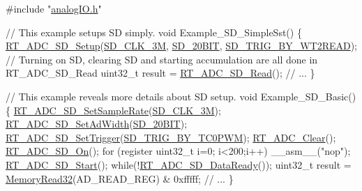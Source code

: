 \begin{DoxyCode}
\textcolor{preprocessor}{#include "\mbox{\hyperlink{a00002}{analogIO.h}}"}

\textcolor{comment}{// This example setups SD simply.}
\textcolor{keywordtype}{void} Example\_SD\_SimpleSst()
\{
    \mbox{\hyperlink{a00002_a312f152517ab50c1cda791e118dd4473}{RT\_ADC\_SD\_Setup}}(\mbox{\hyperlink{a00002_aebc3424fa91b715741f0320561ecfbb0a720c5991be73063f5ab035440f26b486}{SD\_CLK\_3M}}, \mbox{\hyperlink{a00002_a44030e617a742aba101c6dcd3ec2078ea3a9f3242e2567dcfb29f566e45cf6de0}{SD\_20BIT}}, 
      \mbox{\hyperlink{a00002_ab266bb772aaf5cffad6bede99cfb094ca9596adcc3a82f8e983e664a6ed5144a6}{SD\_TRIG\_BY\_WT2READ}});
    \textcolor{comment}{// Turning on SD, clearing SD and starting accumulation are all done in RT\_ADC\_SD\_Read}
    uint32\_t result = \mbox{\hyperlink{a00002_a5532ac461de55576a3875b29300c8536}{RT\_ADC\_SD\_Read}}();
    \textcolor{comment}{// ...}
\}

\textcolor{comment}{// This example reveals more details about SD setup.}
\textcolor{keywordtype}{void} Example\_SD\_Basic()
\{
    \mbox{\hyperlink{a00002_a246ce987fa2b9f254f4796340eb23ed0}{RT\_ADC\_SD\_SetSampleRate}}(\mbox{\hyperlink{a00002_aebc3424fa91b715741f0320561ecfbb0a720c5991be73063f5ab035440f26b486}{SD\_CLK\_3M}});
    \mbox{\hyperlink{a00002_acb989d89893ac99af984979cb9e8df2a}{RT\_ADC\_SD\_SetAdWidth}}(\mbox{\hyperlink{a00002_a44030e617a742aba101c6dcd3ec2078ea3a9f3242e2567dcfb29f566e45cf6de0}{SD\_20BIT}});
    \mbox{\hyperlink{a00002_a11bf38478bd196acd1f179115e714dfc}{RT\_ADC\_SD\_SetTrigger}}(\mbox{\hyperlink{a00002_ab266bb772aaf5cffad6bede99cfb094ca2da9ae6568d907b90ab68f56f8605ada}{SD\_TRIG\_BY\_TC0PWM}});
    \mbox{\hyperlink{a00002_a00318bd4fc3ce7ad4f03124b91891f4f}{RT\_ADC\_Clear}}();
    \mbox{\hyperlink{a00002_a3ed6d7d3daccf57a9ee5a9490d8985ad}{RT\_ADC\_SD\_On}}();
    \textcolor{keywordflow}{for} (\textcolor{keyword}{register} uint32\_t i=0; i<200;i++)
        \_\_asm\_\_(\textcolor{stringliteral}{"nop"});
    \mbox{\hyperlink{a00002_a201094f8f020811fe7d1cb26efe47094}{RT\_ADC\_SD\_Start}}();
    \textcolor{keywordflow}{while}(!\mbox{\hyperlink{a00002_aa3fc5e0f9802d24cd8c0090c86bf9299}{RT\_ADC\_SD\_DataReady}}());
    uint32\_t result = \mbox{\hyperlink{a00020_a2d484dc15bdf30ee11ab3b05f31f0e16}{MemoryRead32}}(AD\_READ\_REG) & 0xfffff;
    \textcolor{comment}{// ...}
\}
\end{DoxyCode}
 